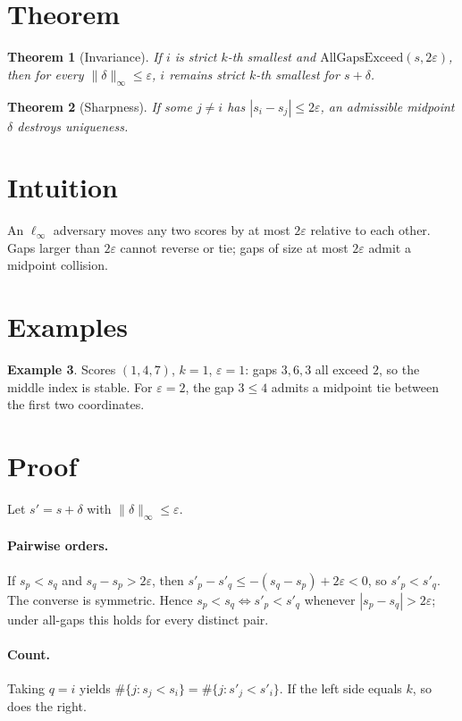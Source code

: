 \documentclass[12pt]{article}
\theoremstyle{plain}
\newtheorem{theorem}{Theorem}
\theoremstyle{definition}
\newtheorem{example}[theorem]{Example}
\theoremstyle{remark}
\begin{document}
\section{Theorem}
\begin{theorem}[Invariance]\label{thm:inv}
If $i$ is strict $k$-th smallest and $\mathrm{AllGapsExceed}(s,2\varepsilon)$, then for every $\|\delta\|_\infty\le\varepsilon$, $i$ remains strict $k$-th smallest for $s+\delta$.
\end{theorem}
\begin{theorem}[Sharpness]\label{thm:sharp}
If some $j\neq i$ has $|s_i-s_j|\le 2\varepsilon$, an admissible midpoint $\delta$ destroys uniqueness.
\end{theorem}

\section{Intuition}
An $\ell_\infty$ adversary moves any two scores by at most $2\varepsilon$ relative to each other. Gaps larger than $2\varepsilon$ cannot reverse or tie; gaps of size at most $2\varepsilon$ admit a midpoint collision.

\section{Examples}
\begin{example}
Scores $(1,4,7)$, $k=1$, $\varepsilon=1$: gaps $3,6,3$ all exceed $2$, so the middle index is stable. For $\varepsilon=2$, the gap $3\le 4$ admits a midpoint tie between the first two coordinates.
\end{example}

\section{Proof}
Let $s'=s+\delta$ with $\|\delta\|_\infty\le\varepsilon$.

\paragraph{Pairwise orders.}
If $s_p<s_q$ and $s_q-s_p>2\varepsilon$, then $s'_p-s'_q\le -(s_q-s_p)+2\varepsilon<0$, so $s'_p<s'_q$. The converse is symmetric. Hence $s_p<s_q\Leftrightarrow s'_p<s'_q$ whenever $|s_p-s_q|>2\varepsilon$; under all-gaps this holds for every distinct pair.

\paragraph{Count.}
Taking $q=i$ yields $\#\{j:s_j<s_i\}=\#\{j:s'_j<s'_i\}$. If the left side equals $k$, so does the right.
\end{document}
